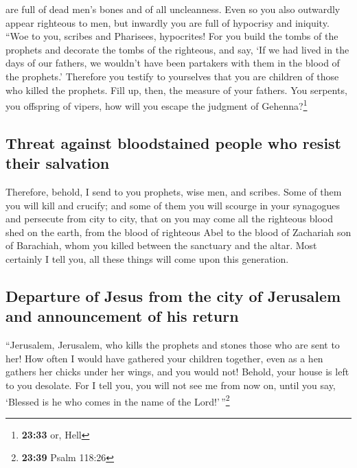 are full of dead men's bones and of all uncleanness. 
Even so you also outwardly appear righteous to men, but inwardly you are
full of hypocrisy and iniquity.  ``Woe to you, scribes
and Pharisees, hypocrites! For you build the tombs of the prophets and
decorate the tombs of the righteous,  and say, `If we had
lived in the days of our fathers, we wouldn't have been partakers with
them in the blood of the prophets.'  Therefore you
testify to yourselves that you are children of those who killed the
prophets.  Fill up, then, the measure of your fathers.
 You serpents, you offspring of vipers, how will you
escape the judgment of Gehenna?\footnote{\textbf{23:33} or, Hell}

\hypertarget{threat-against-bloodstained-people-who-resist-their-salvation}{%
\subsection{Threat against bloodstained people who resist their
salvation}\label{threat-against-bloodstained-people-who-resist-their-salvation}}

 Therefore, behold, I send to you prophets, wise men, and
scribes. Some of them you will kill and crucify; and some of them you
will scourge in your synagogues and persecute from city to city,
 that on you may come all the righteous blood shed on the
earth, from the blood of righteous Abel to the blood of Zachariah son of
Barachiah, whom you killed between the sanctuary and the altar.
 Most certainly I tell you, all these things will come
upon this generation.

\hypertarget{departure-of-jesus-from-the-city-of-jerusalem-and-announcement-of-his-return}{%
\subsection{Departure of Jesus from the city of Jerusalem and
announcement of his
return}\label{departure-of-jesus-from-the-city-of-jerusalem-and-announcement-of-his-return}}

 ``Jerusalem, Jerusalem, who kills the prophets and
stones those who are sent to her! How often I would have gathered your
children together, even as a hen gathers her chicks under her wings, and
you would not!  Behold, your house is left to you
desolate.  For I tell you, you will not see me from now
on, until you say, `Blessed is he who comes in the name of the
Lord!'\,''\footnote{\textbf{23:39} Psalm 118:26}

